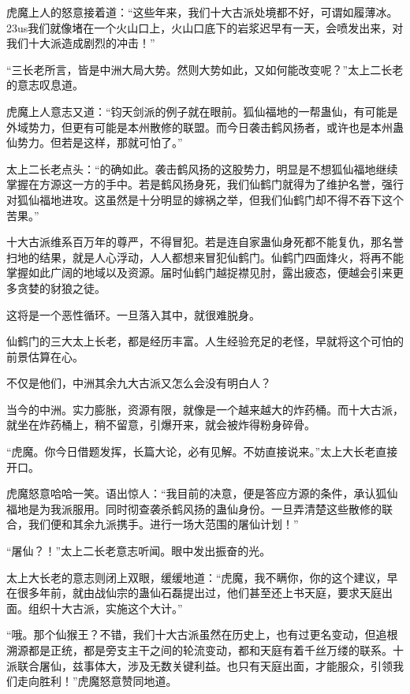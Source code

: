
\begin{this_body}

虎魔上人的怒意接着道：“这些年来，我们十大古派处境都不好，可谓如履薄冰。23us我们就像堵在一个火山口上，火山口底下的岩浆迟早有一天，会喷发出来，对我们十大派造成剧烈的冲击！”

“三长老所言，皆是中洲大局大势。然则大势如此，又如何能改变呢？”太上二长老的意志叹息道。

虎魔上人意志又道：“钧天剑派的例子就在眼前。狐仙福地的一帮蛊仙，有可能是外域势力，但更有可能是本州散修的联盟。而今日袭击鹤风扬者，或许也是本州蛊仙势力。但若是这样，那就可怕了。”

太上二长老点头：“的确如此。袭击鹤风扬的这股势力，明显是不想狐仙福地继续掌握在方源这一方的手中。若是鹤风扬身死，我们仙鹤门就得为了维护名誉，强行对狐仙福地进攻。这虽然是十分明显的嫁祸之举，但我们仙鹤门却不得不吞下这个苦果。”

十大古派维系百万年的尊严，不得冒犯。若是连自家蛊仙身死都不能复仇，那名誉扫地的结果，就是人心浮动，人人都想来冒犯仙鹤门。仙鹤门四面烽火，将再不能掌握如此广阔的地域以及资源。届时仙鹤门越捉襟见肘，露出疲态，便越会引来更多贪婪的豺狼之徒。

这将是一个恶性循环。一旦落入其中，就很难脱身。

仙鹤门的三大太上长老，都是经历丰富。人生经验充足的老怪，早就将这个可怕的前景估算在心。

不仅是他们，中洲其余九大古派又怎么会没有明白人？

当今的中洲。实力膨胀，资源有限，就像是一个越来越大的炸药桶。而十大古派，就坐在炸药桶上，稍不留意，引爆开来，就会被炸得粉身碎骨。

“虎魔。你今日借题发挥，长篇大论，必有见解。不妨直接说来。”太上大长老直接开口。

虎魔怒意哈哈一笑。语出惊人：“我目前的决意，便是答应方源的条件，承认狐仙福地是为我派服用。同时彻查袭杀鹤风扬的蛊仙身份。一旦弄清楚这些散修的联合，我们便和其余九派携手。进行一场大范围的屠仙计划！”

“屠仙？！”太上二长老意志听闻。眼中发出振奋的光。

太上大长老的意志则闭上双眼，缓缓地道：“虎魔，我不瞒你，你的这个建议，早在很多年前，就由战仙宗的蛊仙石磊提出过，他们甚至还上书天庭，要求天庭出面。组织十大古派，实施这个大计。”

“哦。那个仙猴王？不错，我们十大古派虽然在历史上，也有过更名变动，但追根溯源都是正统，都是旁支主干之间的轮流变动，都和天庭有着千丝万缕的联系。十派联合屠仙，兹事体大，涉及无数关键利益。也只有天庭出面，才能服众，引领我们走向胜利！”虎魔怒意赞同地道。


\end{this_body}

